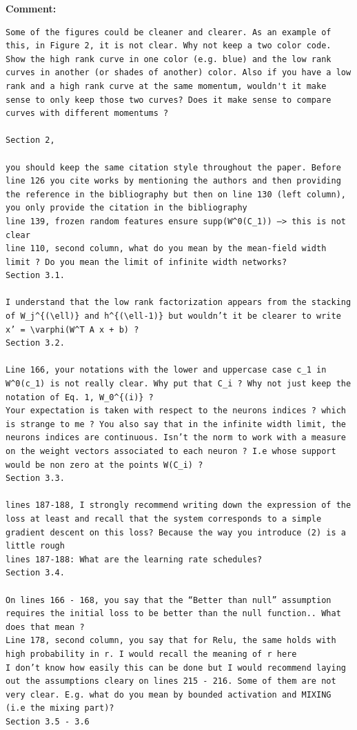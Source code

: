 \documentclass[11pt,a4paper]{article}
\begin{document}
\textbf{Comment:}
\begin{verbatim}
Some of the figures could be cleaner and clearer. As an example of this, in Figure 2, it is not clear. Why not keep a two color code. Show the high rank curve in one color (e.g. blue) and the low rank curves in another (or shades of another) color. Also if you have a low rank and a high rank curve at the same momentum, wouldn't it make sense to only keep those two curves? Does it make sense to compare curves with different momentums ?

Section 2,

you should keep the same citation style throughout the paper. Before line 126 you cite works by mentioning the authors and then providing the reference in the bibliography but then on line 130 (left column), you only provide the citation in the bibliography
line 139, frozen random features ensure supp(W^0(C_1)) —> this is not clear
line 110, second column, what do you mean by the mean-field width limit ? Do you mean the limit of infinite width networks?
Section 3.1.

I understand that the low rank factorization appears from the stacking of W_j^{(\ell)} and h^{(\ell-1)} but wouldn’t it be clearer to write x’ = \varphi(W^T A x + b) ?
Section 3.2.

Line 166, your notations with the lower and uppercase case c_1 in W^0(c_1) is not really clear. Why put that C_i ? Why not just keep the notation of Eq. 1, W_0^{(i)} ?
Your expectation is taken with respect to the neurons indices ? which is strange to me ? You also say that in the infinite width limit, the neurons indices are continuous. Isn’t the norm to work with a measure on the weight vectors associated to each neuron ? I.e whose support would be non zero at the points W(C_i) ?
Section 3.3.

lines 187-188, I strongly recommend writing down the expression of the loss at least and recall that the system corresponds to a simple gradient descent on this loss? Because the way you introduce (2) is a little rough
lines 187-188: What are the learning rate schedules?
Section 3.4.

On lines 166 - 168, you say that the “Better than null” assumption requires the initial loss to be better than the null function.. What does that mean ?
Line 178, second column, you say that for Relu, the same holds with high probability in r. I would recall the meaning of r here
I don’t know how easily this can be done but I would recommend laying out the assumptions cleary on lines 215 - 216. Some of them are not very clear. E.g. what do you mean by bounded activation and MIXING (i.e the mixing part)?
Section 3.5 - 3.6


\end{verbatim}
\end{document}
